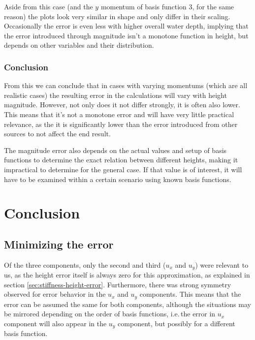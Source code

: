 \documentclass[a4paper, twoside]{article}
\begin{document}
Aside from this case (and the $y$ momentum of basis function 3, for the same reason) the plots look very similar in shape and only differ in their scaling.
Occasionally the error is even less with higher overall water depth, implying that the error introduced through magnitude isn't a monotone function in height, but depends on other variables and their distribution.

\subsubsection{Conclusion}
\label{sec:ord2-magnitude-differing-conclusion}

From this we can conclude that in cases with varying momentums (which are all realistic cases) the resulting error in the calculations will vary with height magnitude.
However, not only does it not differ strongly, it is often also lower.
This means that it's not a monotone error and will have very little practical relevance, as the it is significantly lower than the error introduced from other sources to not affect the end result.

The magnitude error also depends on the actual values and setup of basis functions to determine the exact relation between different heights, making it impractical to determine for the general case.
If that value is of interest, it will have to be examined within a certain scenario using known basis functions.

\clearpage{}

\section{Conclusion}
\label{sec:stiffness-analysis-conclusion}

\subsection{Minimizing the error}
\label{sec:stiffness-analysis-concl-error-0}

Of the three components, only the second and third ($u_x$ and $u_y$) were relevant to us, as the height error itself is always zero for this approximation, as explained in section \ref{sec:stiffness-height-error}.
Furthermore, there was strong symmetry observed for error behavior in the $u_x$ and $u_y$ components.
This means that the error can be assumed the same for both components, although the situations may be mirrored depending on the order of basis functions, i.e.\,the error in $u_x$ component will also appear in the $u_y$ component, but possibly for a different basis function.
\end{document}
